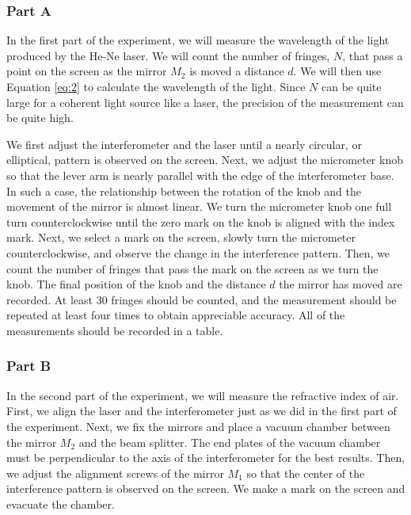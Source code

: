 \documentclass[10pt]{article}
\begin{document}
\subsubsection*{Part A}

In the first part of the experiment, we will measure the wavelength of the light produced by the He-Ne laser. We will count the number of fringes, $N$, that pass a point on the screen as the mirror $M_2$ is moved a distance $d$. We will then use Equation \ref{eq:2} to calculate the wavelength of the light. Since $N$ can be quite large for a coherent light source like a laser, the precision of the measurement can be quite high. 

We first adjust the interferometer and the laser until a nearly circular, or elliptical, pattern is observed on the screen. Next, we adjust the micrometer knob so that the lever arm is nearly parallel with the edge of the interferometer base. In such a case, the relationship between the rotation of the knob and the movement of the mirror is almost linear. We turn the micrometer knob one full turn counterclockwise until the zero mark on the knob is aligned with the index mark. Next, we select a mark on the screen, slowly turn the micrometer counterclockwise, and observe the change in the interference pattern. Then, we count the number of fringes that pass the mark on the screen as we turn the knob. The final position of the knob and the distance $d$ the mirror has moved are recorded. At least 30 fringes should be counted, and the measurement should be repeated at least four times to obtain appreciable accuracy. All of the measurements should be recorded in a table.

\subsubsection*{Part B}

In the second part of the experiment, we will measure the refractive index of air. First, we align the laser and the interferometer just as we did in the first part of the experiment. Next, we fix the mirrors and place a vacuum chamber between the mirror $M_2$ and the beam splitter. The end plates of the vacuum chamber must be perpendicular to the axis of the interferometer for the best results. Then, we adjust the alignment screws of the mirror $M_1$ so that the center of the interference pattern is observed on the screen. We make a mark on the screen and evacuate the chamber.
\end{document}
